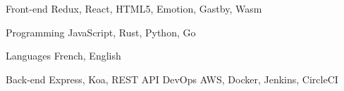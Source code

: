 

\begin{cvskills}

  \cvskill
    {Front-end} %
    {Redux, React, HTML5, Emotion, Gastby, Wasm} %

  \cvskill
    {Programming} %
    {JavaScript, Rust, Python, Go} %

  \cvskill
    {Languages} %
    {French, English} %

\cvskill
  {Back-end} %
  {Express, Koa, REST API} %
\cvskill
  {DevOps} %
  {AWS, Docker, Jenkins, CircleCI} %

\end{cvskills}

